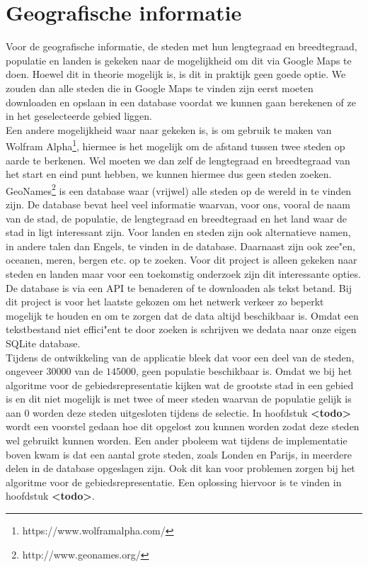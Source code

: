 \documentclass[twoside,openright]{uva-bachelor-thesis}
\begin{document}
	\section{Geografische informatie}
		Voor de geografische informatie, de steden met hun lengtegraad en breedtegraad, populatie en landen is gekeken naar de mogelijkheid om dit via Google Maps te doen. Hoewel dit in theorie mogelijk is, is dit in praktijk geen goede optie. We zouden dan alle steden die in Google Maps te vinden zijn eerst moeten downloaden en opslaan in een database voordat we kunnen gaan berekenen of ze in het geselecteerde gebied liggen.
		\\[0.5cm]
		Een andere mogelijkheid waar naar gekeken is, is om gebruik te maken van Wolfram Alpha\footnote{https://www.wolframalpha.com/}, hiermee is het mogelijk om de afstand tussen twee steden op aarde te berkenen. Wel moeten we dan zelf de lengtegraad en breedtegraad van het start en eind punt hebben, we kunnen hiermee dus geen steden zoeken.
		\\[0.5cm]
		GeoNames\footnote{http://www.geonames.org/} is een database waar (vrijwel) alle steden op de wereld in te vinden zijn. De database bevat heel veel informatie waarvan, voor ons, vooral de naam van de stad, de populatie, de lengtegraad en breedtegraad en het land waar de stad in ligt interessant zijn. Voor landen en steden zijn ook alternatieve namen, in andere talen dan Engels, te vinden in de database. Daarnaast zijn ook zee"en, oceanen, meren, bergen etc. op te zoeken. Voor dit project is alleen gekeken naar steden en landen maar voor een toekomstig onderzoek zijn dit interessante opties.
		\\[0.5cm]
		De database is via een API te benaderen of te downloaden als tekst betand. Bij dit project is voor het laatste gekozen om het netwerk verkeer zo beperkt mogelijk te houden en om te zorgen dat de data altijd beschikbaar is. Omdat een tekstbestand niet effici"ent te door zoeken is schrijven we dedata naar onze eigen SQLite database.
		\\[0.5cm]
		Tijdens de ontwikkeling van de applicatie bleek dat voor een deel van de steden, ongeveer $30000$ van de $145000$, geen populatie beschikbaar is. Omdat we bij het algoritme voor de gebiedsrepresentatie kijken wat de grootste stad in een gebied is en dit niet mogelijk is met twee of meer steden waarvan de populatie gelijk is aan $0$ worden deze steden uitgesloten tijdens de selectie. In hoofdstuk \textbf{<todo>} wordt een voorstel gedaan hoe dit opgelost zou kunnen worden zodat deze steden wel gebruikt kunnen worden. Een ander pboleem wat tijdens de implementatie boven kwam is dat een aantal grote steden, zoals Londen en Parijs, in meerdere delen in de database opgeslagen zijn. Ook dit kan voor problemen zorgen bij het algoritme voor de gebiedsrepresentatie. Een oplossing hiervoor is te vinden in hoofdstuk \textbf{<todo>}.
\end{document}

